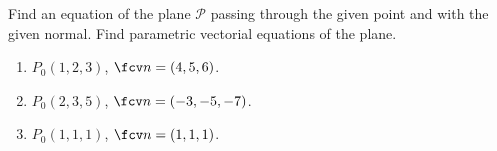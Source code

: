 Find an equation of the plane $\mathcal P$ passing through the given point and with the given normal. Find parametric vectorial equations of the plane.

\begin{enumerate}[ref={\fcProblemRef}]
\item \label{problemFindPlaneFromP(1,2,3)andn(4,5,6)} $P_0(1,2,3) $,  $\fcv n= ( 4, 5, 6 )$.


\item $P_0(2,3,5) $,  $\fcv n= (-3, -5, -7 )$.

\item $P_0(1, 1, 1)$, $\fcv n= ( 1,1,1 )$.

\end{enumerate}
